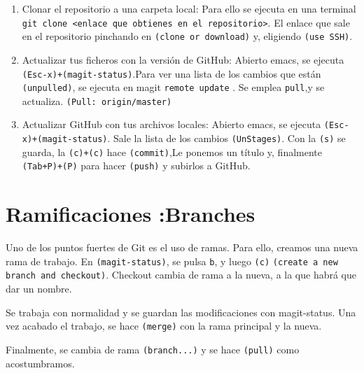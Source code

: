 \begin{enumerate}
\item Clonar el repositorio a una carpeta local:
  Para ello se ejecuta en una terminal
  \texttt{git clone <enlace que obtienes en el repositorio>}. El enlace
  que sale en el repositorio pinchando en \texttt{(clone or download)} y,
  eligiendo \texttt{(use SSH)}.

\item Actualizar tus ficheros con la versión de GitHub:
  Abierto emacs, se ejecuta \texttt{(Esc-x)+(magit-status)}.Para ver una
  lista de los cambios que están \texttt{(unpulled)}, se ejecuta en
  magit \texttt{remote update} . Se emplea \texttt{pull},y se actualiza.
  \texttt{(Pull: origin/master)}
\item Actualizar GitHub con tus archivos locales:
  Abierto emacs, se ejecuta \texttt{(Esc-x)+(magit-status)}. Sale la lista
  de los cambios \texttt{(UnStages)}. Con la \texttt{(s)} se guarda,
  la \texttt{(c)+(c)} hace \texttt{(commit)},Le ponemos un título y,
  finalmente \texttt{(Tab+P)+(P)} para hacer \texttt{(push)} y subirlos
  a GitHub.
\end{enumerate}

\section{Ramificaciones :Branches}

Uno de los puntos fuertes de Git es el uso de ramas. Para ello,
creamos una nueva rama de trabajo. En \texttt{(magit-status)}, se pulsa
\texttt{b}, y luego \texttt{(c)} \texttt{(create a new branch and checkout)}.
Checkout cambia de rama a la nueva, a la que habrá que dar un nombre.

Se trabaja con normalidad y se guardan las modificaciones con magit-status.
Una vez acabado el trabajo, se hace \texttt{(merge)} con la rama principal y
la nueva.

Finalmente, se cambia de rama \texttt{(branch...)} y se hace \texttt{(pull)}
como acostumbramos.